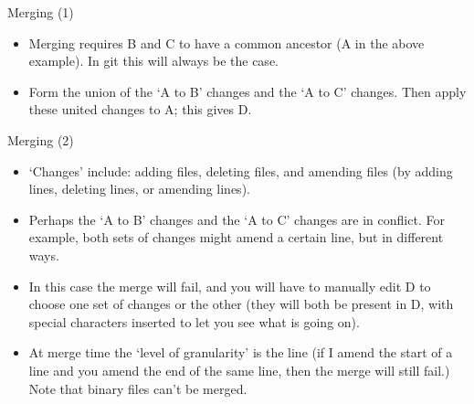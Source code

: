 \documentclass[usenames,dvipsnames]{beamer}
\begin{document}
\begin{frame}{Merging (1)}
  \begin{figure}
    \begin{center}
    \end{center}
  \end{figure}
  \begin{block}{}
    \begin{itemize}
      \item{Merging requires B and C to have a common ancestor (A in the above example). In git this will always be the case.}
      \item{Form the union of the `A to B' changes and the `A to C' changes. Then apply these united changes to A; this gives D.}
    \end{itemize}
  \end{block}
\end{frame}

\begin{frame}{Merging (2)}
  \begin{block}{}
    \begin{itemize}
      \item{`Changes' include: adding files, deleting files, and amending files (by adding lines, deleting lines, or amending lines).}
      \item{Perhaps the `A to B' changes and the `A to C' changes are in conflict. For example, both sets of changes might amend a certain line, but in different ways.}
      \item{In this case the merge will fail, and you will have to manually edit D to choose one set of changes or the other (they will both be present in D, with special characters inserted to let you see what is going on).}
      \item{At merge time the `level of granularity' is the line (if I amend the start of a line and you amend the end of the same line, then the merge will still fail.) Note that binary files can't be merged.}
    \end{itemize}
  \end{block}
\end{frame}
\end{document}

